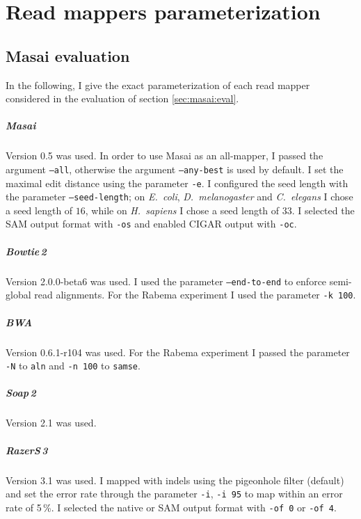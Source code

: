 \chapter{Read mappers parameterization}

\section{Masai evaluation}
\label{sup:masai:param}

In the following, I give the exact parameterization of each read mapper considered in the evaluation of section \ref{sec:masai:eval}.

\paragraph{Masai}
Version 0.5 was used.
In order to use Masai as an all-mapper, I passed the argument \texttt{--all}, otherwise the argument \texttt{--any-best} is used by default.
I set the maximal edit distance using the parameter \texttt{-e}.
I configured the seed length with the parameter \texttt{--seed-length}; on \emph{E.~coli}, \emph{D.~melanogaster} and \emph{C.~elegans} I chose a seed length of $16$, while on \emph{H.~sapiens} I chose a seed length of $33$.
I selected the SAM output format with \texttt{-os} and enabled CIGAR output with \texttt{-oc}.

\paragraph{Bowtie\,2}
Version 2.0.0-beta6 was used.
I used the parameter \texttt{--end-to-end} to enforce semi-global read alignments.
For the Rabema experiment I used the parameter \texttt{-k 100}.

\paragraph{BWA}
Version 0.6.1-r104 was used.
For the Rabema experiment I passed the parameter \texttt{-N} to \texttt{aln} and \texttt{-n 100} to \texttt{samse}.

\paragraph{Soap\,2}
Version 2.1 was used.

\paragraph{RazerS\,3}
Version 3.1 was used.
I mapped with indels using the pigeonhole filter (default) and set the error rate through the parameter \texttt{-i}, \eg \texttt{-i 95} to map within an error rate of 5\,\%.
I selected the native or SAM output format with \texttt{-of 0} or \texttt{-of 4}.

